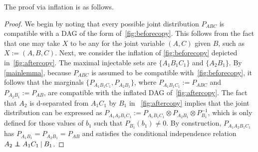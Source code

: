 {The proof via inflation is as follows.
\begin{proof}
We begin by noting that every possible joint distribution $P_{ABC}$ is compatible with a DAG of the form of~\cref{fig:beforecopy}.  This follows from the fact that one may take $X$ to be any  for the joint variable $(A,C)$ given $B$, such as $X := (A,B,C)$.  Next, we consider the inflation of \cref{fig:beforecopy} depicted in~\cref{fig:aftercopy}. The maximal injectable sets are $\{ A_1 B_1 C_1\}$ and $\{A_2 B_1\}$.  By \cref{mainlemma}, because $P_{ABC}$ is assumed to be compatible with~\cref{fig:beforecopy}, it follows that the marginals $\{ P_{A_1 B_1 C_1}, P_{A_2 B_1}\}$, where $P_{A_1 B_1 C_1}:= P_{A B C}$ and $P_{A_2 B_1} := P_{AB}$, are compatible with the inflated DAG of~\cref{fig:aftercopy}.  The fact that $A_2$ is d-separated from $A_1 C_1$ by $B_1$ in ~\cref{fig:aftercopy} implies that the joint distribution can be expressed as $P_{A_1 A_2 B_1 C_1} := P_{A_1 B_1 C_1} \otimes P_{A_2 B_1} \otimes P_{B_1}^{-1}$, which is only defined for those values of $b_1$ such that $P_{B_1}(b_1) \ne 0$.  By construction, $P_{A_1 A_2 B_1 C_1}$ has $P_{A_1 B_1}= P_{A_2 B_1} =P_{AB}$ and satisfies the conditional independence relation $A_2 \perp\!\!\!\!\perp A_1 C_1 \:|\: B_1$.
\end{proof}


}
